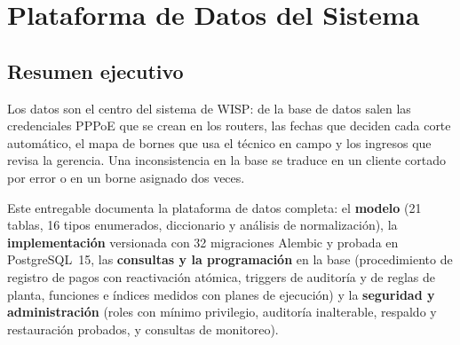 \chapter{Plataforma de Datos del Sistema}
\label{chap:ce02-datos}



\section*{Resumen ejecutivo}

Los datos son el centro del sistema de WISP: de la base de datos salen las credenciales
PPPoE que se crean en los routers, las fechas que deciden cada corte automático, el
mapa de bornes que usa el técnico en campo y los ingresos que revisa la gerencia. Una
inconsistencia en la base se traduce en un cliente cortado por error o en un borne
asignado dos veces.

Este entregable documenta la plataforma de datos completa: el \textbf{modelo} (21
tablas, 16 tipos enumerados, diccionario y análisis de normalización), la
\textbf{implementación} versionada con 32 migraciones Alembic y probada en
PostgreSQL~15, las \textbf{consultas y la programación} en la base (procedimiento de
registro de pagos con reactivación atómica, triggers de auditoría y de reglas de planta,
funciones e índices medidos con planes de ejecución) y la \textbf{seguridad y
administración} (roles con mínimo privilegio, auditoría inalterable, respaldo y
restauración probados, y consultas de monitoreo).

